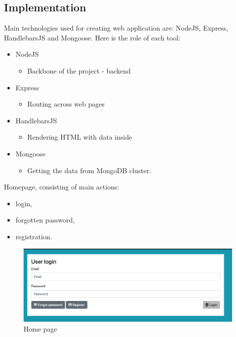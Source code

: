 \subsection{Implementation}

Main technologies used for creating web application are: NodeJS, Express, HandlebarsJS and Mongoose. Here is the role of each tool:
\begin{itemize}
  \item NodeJS
  \begin{itemize}
    \item Backbone of the project - backend
  \end{itemize}
  \item Express
  \begin{itemize}
    \item Routing across web pages
  \end{itemize}
  \item HandlebarsJS
  \begin{itemize}
    \item Rendering HTML with data inside
  \end{itemize}
  \item Mongoose
  \begin{itemize}
    \item Getting the data from MongoDB cluster.
  \end{itemize}
\end{itemize}

Homepage, consisting of main actions:
\begin{itemize}
  \item login,
  \item forgotten password,
  \item registration.
\end{itemize}
\begin{figure}[H]
\includegraphics[scale=0.4]{img/homePage.jpeg}
\centering
\caption{Home page}
\end{figure}

